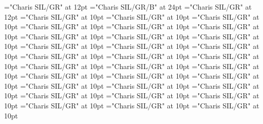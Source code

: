 \documentclass[a4paper]{article}
\begin{document}
\pagestyle{plain}
\sloppy
\setlength{\parfillskip}{0pt plus 1fil}
\font{}="Charis SIL/GR" at 12pt
\font{}="Charis SIL/GR/B" at 24pt
\font{}="Charis SIL/GR" at 12pt
\font\entryletDatadicBody="Charis SIL/GR" at 10pt
\font\pictureRightentryletDatadicBody="Charis SIL/GR" at 10pt
\font\picturepictureRightentryletDatadicBody="Charis SIL/GR" at 10pt
\font\pictureCaptionpictureRightentryletDatadicBody="Charis SIL/GR" at 10pt
\font\CmPicturepublishStemPileThumbnailPubpictureCaptionpictureRightentryletDatadicBody="Charis SIL/GR" at 10pt
\font\pictureLabelenpictureCaptionpictureRightentryletDatadicBody="Charis SIL/GR" at 10pt
\font\spanenpictureLabelenpictureCaptionpictureRightentryletDatadicBody="Charis SIL/GR" at 10pt
\font\headwordggoTeluxINentryletDatadicBody="Charis SIL/GR" at 10pt
\font\pronunciationsentryletDatadicBody="Charis SIL/GR" at 10pt
\font\pronunciationggofonipaxemicpronunciationsentryletDatadicBody="Charis SIL/GR" at 10pt
\font\spanggofonipaxemicpronunciationggofonipaxemicpronunciationsentryletDatadicBody="Charis SIL/GR" at 10pt
\font\sensesentryletDatadicBody="Charis SIL/GR" at 10pt
\font\sensesensesentryletDatadicBody="Charis SIL/GR" at 10pt
\font\grammaticalinfosensesensesentryletDatadicBody="Charis SIL/GR" at 10pt
\font\partofspeechengrammaticalinfosensesensesentryletDatadicBody="Charis SIL/GR" at 10pt
\font\spanenpartofspeechengrammaticalinfosensesensesentryletDatadicBody="Charis SIL/GR" at 10pt
\font\xsensenumbersensesentryletDatadicBody="Charis SIL/GR" at 10pt
\font{}="Charis SIL/GR" at 10pt
\font\spanendefinitionensensesensesentryletDatadicBody="Charis SIL/GR" at 10pt
\font\LexSensepublishStemGlossPubensensesensesentryletDatadicBody="Charis SIL/GR" at 10pt
\font\spanenLexSensepublishStemGlossPubensensesensesentryletDatadicBody="Charis SIL/GR" at 10pt
\font\examplessensesensesentryletDatadicBody="Charis SIL/GR" at 10pt
\font\exampleggoTeluxINexamplessensesensesentryletDatadicBody="Charis SIL/GR" at 10pt
\font\spanggoTeluxINexampleggoTeluxINexamplessensesensesentryletDatadicBody="Charis SIL/GR" at 10pt
\font\translationsexamplessensesensesentryletDatadicBody="Charis SIL/GR" at 10pt
\font\translationentranslationsexamplessensesensesentryletDatadicBody="Charis SIL/GR" at 10pt
\font\xitementranslationentranslationsexamplessensesensesentryletDatadicBody="Charis SIL/GR" at 10pt
\font\spanenxitementranslationentranslationsexamplessensesensesentryletDatadicBody="Charis SIL/GR" at 10pt
\font\xitemtetranslationentranslationsexamplessensesensesentryletDatadicBody="Charis SIL/GR" at 10pt
\font\spantexitemtetranslationentranslationsexamplessensesensesentryletDatadicBody="Charis SIL/GR" at 10pt
\end{document}
